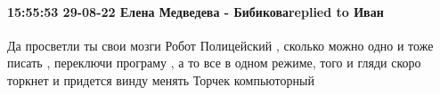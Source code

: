  
 
 
 
 

\paragraph{15:55:53 29-08-22 Елена Медведева - Бибиковаreplied to Иван}

Да просветли ты свои мозги Робот Полицейский , сколько можно одно и тоже писать
, переключи програму , а то все в одном режиме, того и гляди скоро торкнет и
придется винду менять Торчек компьюторный
